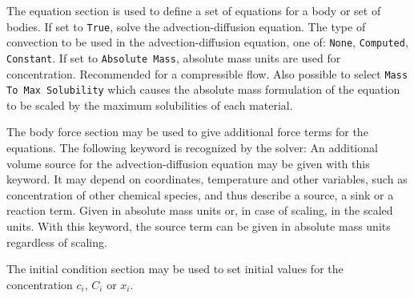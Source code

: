 The equation section is used to define a set of equations for a body or set of bodies.
\sifbegin
{} If set to {\tt True}, solve the advection-diffusion equation.
The type of convection to be used
in the advection-diffusion equation, one of: {\tt None}, {\tt Computed}, {\tt Constant}.
If set to {\tt Absolute Mass}, absolute mass units are used for concentration.
Recommended for a compressible flow. Also possible to select {\tt Mass
To Max Solubility} which causes the absolute mass formulation of the 
equation to be scaled by the maximum solubilities of each material.
\sifend

The body force section may be used to give additional force terms for the equations.
The following keyword is recognized by the solver:
\sifbegin
{}
An additional volume source for the advection-diffusion equation may be given
with this keyword. It may depend on coordinates, temperature and other variables, such as concentration of other chemical species, and thus describe a source,
a sink or a reaction term. Given in absolute mass units or, in case of
scaling, in the scaled units.
With this keyword, the source term can be given in absolute mass units
regardless of scaling.
\sifend


The initial condition section may be used to set initial values for the
concentration $c_i$, $C_i$ or $x_i$.
\sifbegin
{}
\sifend

